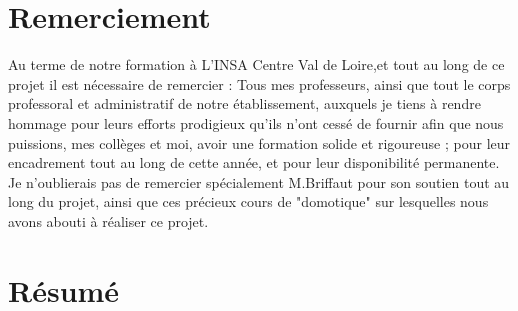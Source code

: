 \newpage
\section*{Remerciement}
Au terme de notre formation à L’INSA Centre Val de Loire,et tout au long de ce projet il est nécessaire de remercier :\newline
Tous mes professeurs, ainsi que tout le corps professoral et administratif de notre établissement, auxquels je tiens à rendre hommage pour leurs efforts prodigieux qu’ils n’ont cessé de fournir afin que nous puissions, mes collèges et moi, avoir une formation solide et rigoureuse ; pour leur encadrement tout au long de cette année, et pour leur disponibilité permanente. Je n’oublierais pas de remercier spécialement M.Briffaut pour son soutien tout au long du projet, ainsi que ces précieux cours de "domotique" sur lesquelles nous avons abouti à réaliser ce projet.\newline
\clearpage
\section*{Résumé}

\newpage
\tableofcontents
\clearpage

%

